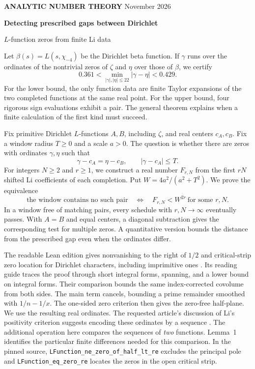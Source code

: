 \documentclass[11pt,letterpaper]{article}
\newcommand{\subt}[1]{\par\smallskip{\sffamily\bfseries\color{teal}#1}\par\nobreak}
\newcommand{\code}[1]{\texttt{#1}}
\begin{document}
\thispagestyle{plain}
{\sffamily\small\color{teal}\bfseries ANALYTIC NUMBER THEORY}\hfill
{\small{} November 2026}
\vspace{7pt}

{\LARGE\bfseries\color{ink} Detecting prescribed gaps between Dirichlet\par
\vspace{1pt} \(L\)-function zeros from finite Li data\par}
\vspace{5pt}
Let $\beta(s)=L(s,\chi_{-4})$ be the Dirichlet beta function. If $\gamma$ runs over the
ordinates of the nontrivial zeros of $\zeta$ and $\eta$ over those of $\beta$, we certify
\[
  \boxed{\quad 0.361 <
  \min_{|\gamma|,|\eta|\le 22}|\gamma-\eta| < 0.429 .\quad}
\]
For the lower bound, the only function data are finite Taylor expansions of
the two completed functions at the same real point. For the upper bound,
four rigorous sign evaluations exhibit a pair. The general theorem explains
when a finite calculation of the first kind must succeed.

\subt{The finite test}
Fix primitive Dirichlet $L$-functions $A,B$, including $\zeta$, and real centers
$c_A,c_B$. Fix a window radius $T\ge0$ and a scale $a>0$. The question is whether
there are zeros with ordinates $\gamma,\eta$ such that
\[
 \gamma-c_A=\eta-c_B,\qquad |\gamma-c_A|\le T .
\]
For integers $N\ge2$ and $r\ge1$, we construct a real number $F_{r,N}$
from the first $rN$ shifted Li coefficients of each completion. Put
$W=4a^2/(a^2+T^2)$. We prove the equivalence
\[
 \text{the window contains no such pair}
 \quad\Longleftrightarrow\quad
 F_{r,N}<W^{2r}\ \text{for some }r,N .
\]
In a window free of matching pairs, every schedule with $r,N\to\infty$
eventually passes. With $A=B$ and equal centers, a diagonal subtraction gives
the corresponding test for multiple zeros. A quantitative version bounds the
distance from the prescribed gap even when the ordinates differ.

\subt{What comes from the two sources}
The readable Lean edition gives nonvanishing to the right of $1/2$ and
critical-strip zero location for Dirichlet characters, including imprimitive
ones \cite{lean}. Its reading guide traces the proof through short integral forms,
spanning, and a lower bound on integral forms. Their comparison bounds the same index-corrected covolume from both sides.
The main term cancels, bounding a prime remainder smoothed with $1/n-1/x$.
The one-sided zero criterion then gives the zero-free half-plane.
We use the resulting real ordinates. The requested article's discussion of
Li's positivity criterion suggests encoding these ordinates by a sequence
\cite{wiki,bl}. The additional operation here compares the sequences of
\emph{two} functions. Lemma~1 identifies the particular finite differences
needed for this comparison. In the pinned source,
\code{LFunction\_ne\_zero\_of\_half\_lt\_re} excludes the principal pole
and \code{LFunction\_eq\_zero\_re} locates the zeros in the open critical strip.
\end{document}
